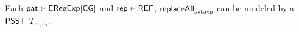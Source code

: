 %  


\begin{theorem}
  Each $\mathsf{pat} \in {\sf ERegExp}[\sf CG]$ and $\mathsf{rep} \in {\sf REF}$, $\mathsf{replaceAll}_{\mathsf{pat}, \mathsf{rep}}$ can be modeled by a ${\sf PSST}${} $T_{e_1,e_2}$.
\end{theorem}

